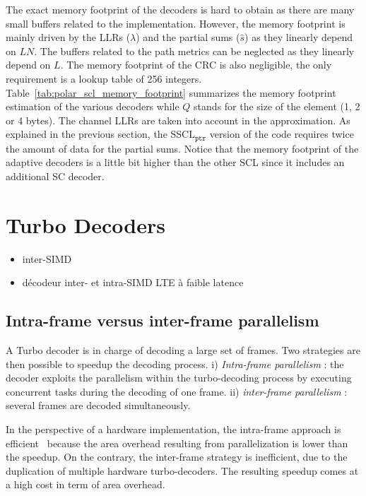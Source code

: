The exact memory footprint of the decoders is hard to obtain as there are many
small buffers related to the implementation. However, the memory footprint is
mainly driven by the LLRs ($\lambda$) and the partial sums ($\hat{s}$) as they
linearly depend on $LN$. The buffers related to the path metrics can be
neglected as they linearly depend on $L$. The memory footprint of the CRC is
also negligible, the only requirement is a lookup table of 256 integers.
Table~\ref{tab:polar_scl_memory_footprint} summarizes the memory footprint
estimation of the various decoders while $Q$ stands for the size of the element
(1, 2 or 4 bytes). The channel LLRs are taken into account in the approximation.
As explained in the previous section, the SSCL$_{\texttt{ptr}}$ version of the
code requires twice the amount of data for the partial sums. Notice that the
memory footprint of the adaptive decoders is a little bit higher than the other
SCL since it includes an additional SC decoder.

\section{Turbo Decoders}

\begin{itemize}
  \item inter-SIMD
  \item décodeur inter- et intra-SIMD LTE à faible latence
\end{itemize}

\subsection{Intra-frame versus inter-frame parallelism}

A Turbo decoder is in charge of decoding a large set of frames. Two strategies
are then possible to speedup the decoding process. i)
\textit{Intra-frame parallelism} : the decoder exploits the parallelism within
the turbo-decoding process by executing concurrent tasks during
the decoding of one frame. ii) \textit{inter-frame parallelism} : several frames
are decoded simultaneously.

In the perspective of a hardware implementation, the intra-frame approach is
efficient~\cite{Muller2009} because the area overhead resulting from
parallelization is lower than the speedup. On the contrary, the inter-frame
strategy is inefficient, due to the duplication of multiple hardware
turbo-decoders. The resulting speedup comes at a high cost in term of area
overhead.

